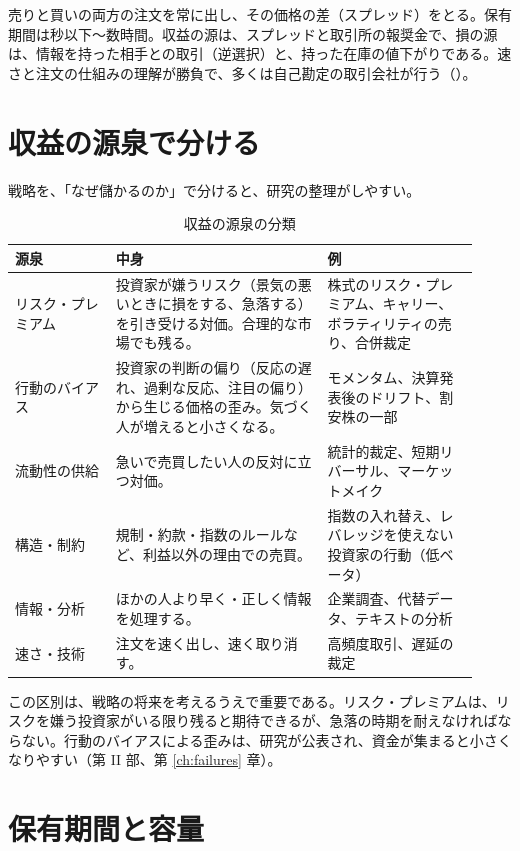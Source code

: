 売りと買いの両方の注文を常に出し、その価格の差（スプレッド）をとる。保有期間は秒以下〜数時間。収益の源は、スプレッドと取引所の報奨金で、損の源は、情報を持った相手との取引（逆選択）と、持った在庫の値下がりである。速さと注文の仕組みの理解が勝負で、多くは自己勘定の取引会社が行う（）。

\section{収益の源泉で分ける}

戦略を、「なぜ儲かるのか」で分けると、研究の整理がしやすい。

\begin{table}[H]
\centering\small
\caption{収益の源泉の分類}
\label{tab:sources}
\begin{tabular}{@{}P{0.2\linewidth}P{0.42\linewidth}P{0.3\linewidth}@{}}
\toprule
源泉 & 中身 & 例 \\
\midrule
リスク・プレミアム & 投資家が嫌うリスク（景気の悪いときに損をする、急落する）を引き受ける対価。合理的な市場でも残る。 & 株式のリスク・プレミアム、キャリー、ボラティリティの売り、合併裁定 \\
行動のバイアス & 投資家の判断の偏り（反応の遅れ、過剰な反応、注目の偏り）から生じる価格の歪み。気づく人が増えると小さくなる。 & モメンタム、決算発表後のドリフト、割安株の一部 \\
流動性の供給 & 急いで売買したい人の反対に立つ対価。 & 統計的裁定、短期リバーサル、マーケットメイク \\
構造・制約 & 規制・約款・指数のルールなど、利益以外の理由での売買。 & 指数の入れ替え、レバレッジを使えない投資家の行動（低ベータ） \\
情報・分析 & ほかの人より早く・正しく情報を処理する。 & 企業調査、代替データ、テキストの分析 \\
速さ・技術 & 注文を速く出し、速く取り消す。 & 高頻度取引、遅延の裁定 \\
\bottomrule
\end{tabular}
\end{table}

この区別は、戦略の将来を考えるうえで重要である。リスク・プレミアムは、リスクを嫌う投資家がいる限り残ると期待できるが、急落の時期を耐えなければならない。行動のバイアスによる歪みは、研究が公表され、資金が集まると小さくなりやすい（第 II 部、第 \ref{ch:failures} 章）。

\section{保有期間と容量}

